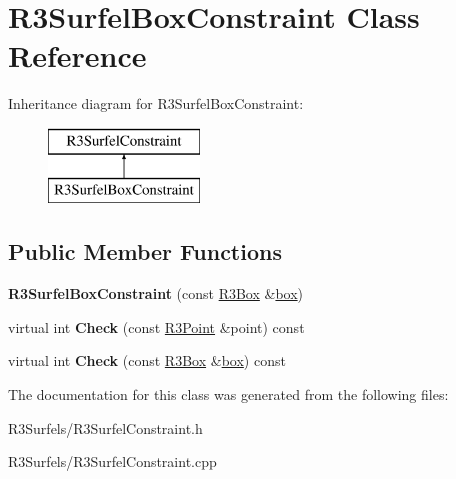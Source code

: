 \hypertarget{class_r3_surfel_box_constraint}{}\section{R3\+Surfel\+Box\+Constraint Class Reference}
\label{class_r3_surfel_box_constraint}
Inheritance diagram for R3\+Surfel\+Box\+Constraint\+:\begin{figure}[H]
\begin{center}
\leavevmode
\includegraphics[height=2.000000cm]{class_r3_surfel_box_constraint}
\end{center}
\end{figure}
\subsection*{Public Member Functions}
\begin{DoxyCompactItemize}
\item 
{\bfseries R3\+Surfel\+Box\+Constraint} (const \hyperlink{class_r3_box}{R3\+Box} \&\hyperlink{structbox}{box})\hypertarget{class_r3_surfel_box_constraint_a5ec1fe2c5799d3e518ccc7032e80db0c}{}\label{class_r3_surfel_box_constraint_a5ec1fe2c5799d3e518ccc7032e80db0c}

\item 
virtual int {\bfseries Check} (const \hyperlink{class_r3_point}{R3\+Point} \&point) const \hypertarget{class_r3_surfel_box_constraint_ae3731306d61b3f2006e99ea9e36ef55e}{}\label{class_r3_surfel_box_constraint_ae3731306d61b3f2006e99ea9e36ef55e}

\item 
virtual int {\bfseries Check} (const \hyperlink{class_r3_box}{R3\+Box} \&\hyperlink{structbox}{box}) const \hypertarget{class_r3_surfel_box_constraint_ae9751bf2292546db9940411ca2e3ccd5}{}\label{class_r3_surfel_box_constraint_ae9751bf2292546db9940411ca2e3ccd5}

\end{DoxyCompactItemize}


The documentation for this class was generated from the following files\+:\begin{DoxyCompactItemize}
\item 
R3\+Surfels/R3\+Surfel\+Constraint.\+h\item 
R3\+Surfels/R3\+Surfel\+Constraint.\+cpp\end{DoxyCompactItemize}
